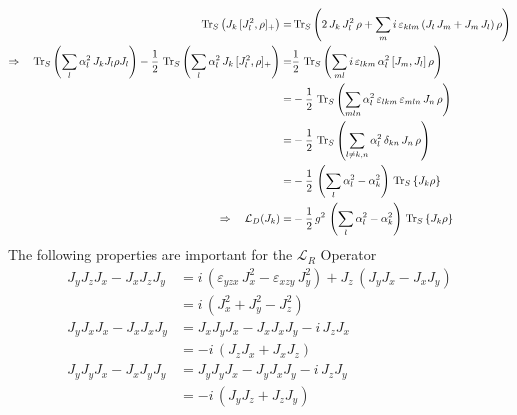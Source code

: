 \documentclass{article}
\begin{document}
\begin{align*}
    \operatorname{Tr}_S\left(J_k\,[J_l^2,\rho]_+\right)=&\operatorname{Tr}_S\left(2\,J_k\,J_l^2\,\rho+\sum_mi\,\varepsilon_{klm}\,(J_l\,J_m+J_m\,J_l)\,\rho\right)\\
    \Rightarrow\quad\operatorname{Tr}_S\left(\sum_l \alpha_l^2\,J_kJ_l\rho J_l\right)-\frac{1}{2}\,\operatorname{Tr}_S\left(\sum_l \alpha_l^2\,J_k\,[J_l^2,\rho]_+\right)=&\frac{1}{2}\,\operatorname{Tr}_S\left(\sum_{ml}i\,\varepsilon_{lkm}\,\alpha_l^2\,[J_m,J_l]\,\rho\right)\\
    =&-\frac{1}{2}\,\operatorname{Tr}_S\left(\sum_{mln}\alpha_l^2\,\varepsilon_{lkm}\,\varepsilon_{mln}\,J_n\,\rho\right)\\
    =&-\frac{1}{2}\,\operatorname{Tr}_S\left(\sum_{l\neq k,n}\alpha_l^2\,\delta_{kn}\,J_n\,\rho\right)\\
    =&-\frac{1}{2}\,\left(\sum_l\alpha_l^2-\alpha_k^2\right)\,\operatorname{Tr}_S\left\{J_k\rho\right\}\\
    \Rightarrow\quad\mathcal{L}_D(J_k)=&-\frac{1}{2}\,g^2\,\left(\sum_l\alpha_l^2-\alpha_k^2\right)\,\operatorname{Tr}_S\left\{J_k\rho\right\}
\end{align*}
The following properties are important for the $\mathcal{L}_R$ Operator
\begin{align*}
    J_yJ_zJ_x-J_xJ_zJ_y&=i\,(\varepsilon_{yzx}\,J_x^2-\varepsilon_{xzy}\,J_y^2)+J_z\,(J_y J_x - J_x J_y)\\
    &=i\,(J_x^2+J_y^2-J_z^2)\\
    J_y J_x J_x-J_x J_x J_y&=J_x J_y J_x - J_x J_x J_y -i\,J_z J_x\\
    &=-i\,(J_z J_x + J_x J_z)\\
    J_y J_y J_x-J_x J_y J_y&=J_y J_y J_x - J_y J_x J_y - i\,J_z J_y\\
    &=-i\,(J_y J_z + J_z J_y)
\end{align*}
\end{document}
